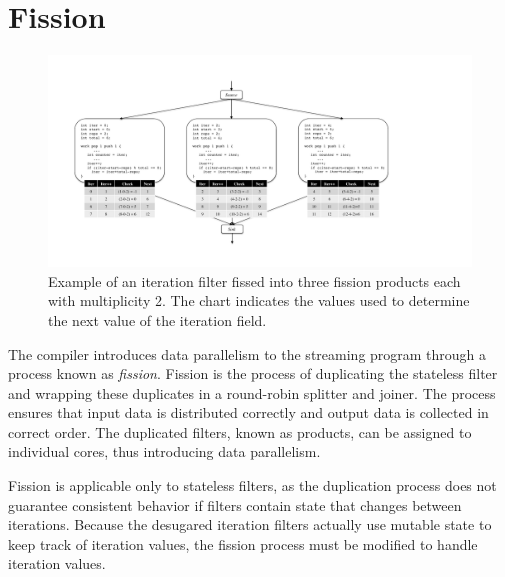 \section{Fission}
\label{sec:fission}


\begin{figure}[t!]
\centering
\includegraphics[width=6.5in]{figures/fission-example.pdf}
\caption{Example of an iteration filter fissed into three fission products each with multiplicity 2.  The chart indicates the values used to determine the next value of the iteration field.  \protect\label{fig:fission-example}}
\end{figure}

The compiler introduces data parallelism to the streaming program through a process known as {\it fission}.  Fission is the process of duplicating the stateless filter and wrapping these duplicates in a round-robin splitter and joiner.  The process ensures that input data is distributed correctly and output data is collected in correct order.  The duplicated filters, known as products, can be assigned to individual cores, thus introducing data parallelism.  

Fission is applicable only to stateless filters, as the duplication process does not guarantee consistent behavior if filters contain state that changes between iterations.  Because the desugared iteration filters actually use mutable state to keep track of iteration values, the fission process must be modified to handle iteration values.  


